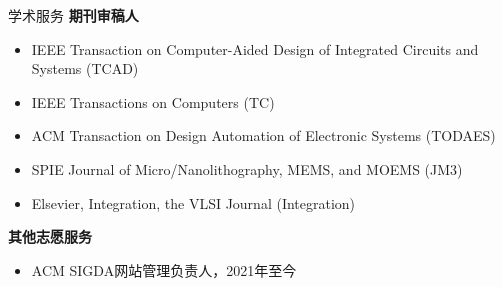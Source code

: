 \begin{rSection}{学术服务}
\textbf{期刊审稿人}
\begin{itemize}
    \item IEEE Transaction on Computer-Aided Design of Integrated Circuits and Systems (TCAD)
    \item IEEE Transactions on Computers (TC)
    \item ACM Transaction on Design Automation of Electronic Systems (TODAES)
    \item SPIE Journal of Micro/Nanolithography, MEMS, and MOEMS (JM3)
    \item Elsevier, Integration, the VLSI Journal (Integration)
\end{itemize}

\textbf{其他志愿服务}
\begin{itemize}
    \item ACM SIGDA网站管理负责人，2021年至今
\end{itemize}

\end{rSection}


